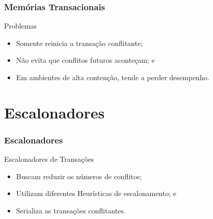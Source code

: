 \documentclass[10pt, pdf,xcolor=pdftex,dvipsnames,table]{beamer}
\begin{document}
\begin{frame} \frametitle{Memórias Transacionais}
    \begin{alertblock}{Problemas}
        \begin{itemize}
        	\item Somente reinicia a transação conflitante;
        	\item Não evita que conflitos futuros aconteçam; e
        	\item Em ambientes de alta contenção, tende a perder desempenho.
        \end{itemize}
    \end{alertblock}
\end{frame}

\section{Escalonadores}
\begin{frame} \frametitle{Escalonadores}
\begin{block}{Escalonadores de Transações}
\begin{itemize}
	\item Buscam reduzir os números de conflitos;
	\item Utilizam diferentes Heurísticas de escalonamento; e
	\item Serializa as transações conflitantes.
\end{itemize}
\end{block}
\end{frame}
\end{document}
